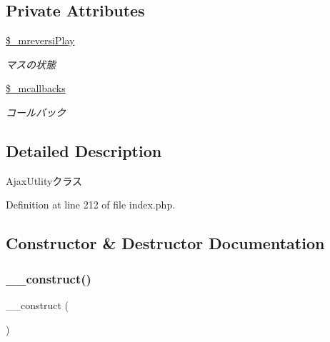 \subsection*{Private Attributes}
\begin{DoxyCompactItemize}
\item 
\mbox{\label{class_c_ajax_utility_a2fdd2d2fbdbbba0dcd580cddf288b52e}} 
\hyperlink{class_c_ajax_utility_a2fdd2d2fbdbbba0dcd580cddf288b52e}{\$\+\_\+mreversi\+Play}
\begin{DoxyCompactList}\small\item\em マスの状態 \end{DoxyCompactList}\item 
\mbox{\label{class_c_ajax_utility_a384148a010c9db0531ea492d63bd4887}} 
\hyperlink{class_c_ajax_utility_a384148a010c9db0531ea492d63bd4887}{\$\+\_\+mcallbacks}
\begin{DoxyCompactList}\small\item\em コールバック \end{DoxyCompactList}\end{DoxyCompactItemize}


\subsection{Detailed Description}
Ajax\+Utlityクラス 

Definition at line 212 of file index.\+php.



\subsection{Constructor \& Destructor Documentation}
\mbox{\label{class_c_ajax_utility_a095c5d389db211932136b53f25f39685}} 
\subsubsection{\texorpdfstring{\+\_\+\+\_\+construct()}{\_\_construct()}}
{\footnotesize\ttfamily \+\_\+\+\_\+construct (\begin{DoxyParamCaption}{ }\end{DoxyParamCaption})}



